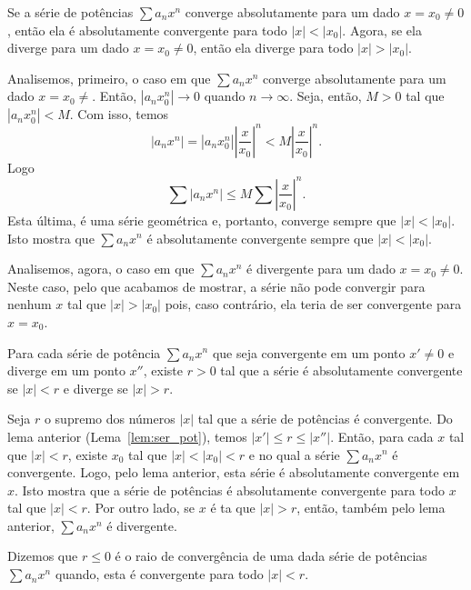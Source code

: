 \begin{lem}\label{lem:ser_pot}
  Se a série de potências $\sum a_nx^n$ converge absolutamente para um dado $x=x_0\neq 0$, então ela é absolutamente convergente para todo $|x|<|x_0|$. Agora, se ela diverge para um dado $x=x_0\neq 0$, então ela diverge para todo $|x|>|x_0|$.
\end{lem}
\begin{dem}
  Analisemos, primeiro, o caso em que $\sum a_nx^n$ converge absolutamente para um dado $x=x_0\neq$. Então, $|a_nx_0^n|\to 0$ quando $n\to \infty$. Seja, então, $M>0$ tal que $|a_nx_0^n| < M$. Com isso, temos
  \begin{equation}
    |a_nx^n| = |a_nx_0^n|\left|\frac{x}{x_0}\right|^n < M\left|\frac{x}{x_0}\right|^n.
  \end{equation}
Logo
\begin{equation}
  \sum |a_nx^n| \leq M\sum \left|\frac{x}{x_0}\right|^n.
\end{equation}
Esta última, é uma série geométrica e, portanto, converge sempre que $|x|<|x_0|$. Isto mostra que $\sum a_nx^n$ é absolutamente convergente sempre que $|x|<|x_0|$.

Analisemos, agora, o caso em que $\sum a_nx^n$ é divergente para um dado $x=x_0\neq 0$. Neste caso, pelo que acabamos de mostrar, a série não pode convergir para nenhum $x$ tal que $|x|>|x_0|$ pois, caso contrário, ela teria de ser convergente para $x=x_0$.
\end{dem}

\begin{teo}\label{teo:raio_de_convergencia}
  Para cada série de potência $\sum a_nx^n$ que seja convergente em um ponto $x'\neq 0$ e diverge em um ponto $x''$, existe $r>0$ tal que a série é absolutamente convergente se $|x|<r$ e diverge se $|x|>r$.
\end{teo}
\begin{dem}
  Seja $r$ o supremo dos números $|x|$ tal que a série de potências é convergente. Do lema anterior (Lema~\ref{lem:ser_pot}), temos $|x'|\leq r \leq |x''|$. Então, para cada $x$ tal que $|x|<r$, existe $x_0$ tal que $|x|<|x_0|<r$ e no qual a série $\sum a_nx^n$ é convergente. Logo, pelo lema anterior, esta série é absolutamente convergente em $x$. Isto mostra que a série de potências é absolutamente convergente para todo $x$ tal que $|x|<r$. Por outro lado, se $x$ é ta que $|x|>r$, então, também pelo lema anterior, $\sum a_nx^n$ é divergente.
\end{dem}

\begin{defn}
  Dizemos que $r\leq 0$ é o raio de convergência de uma dada série de potências $\sum a_nx^n$ quando, esta é convergente para todo $|x|<r$.
\end{defn}

